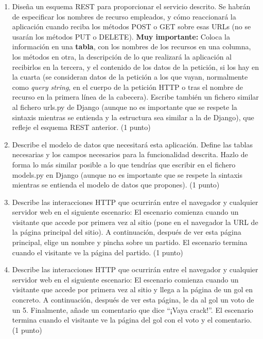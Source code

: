\begin{enumerate}
  \item Diseña un esquema REST para proporcionar el servicio descrito. Se habrán de especificar los nombres de recurso empleados, y cómo reaccionará la aplicación cuando reciba los métodos POST o GET sobre esas URLs (no se usarán los métodos PUT o DELETE). \textbf{Muy importante:} Coloca la información en una \textbf{tabla}, con los nombres de los recursos en una columna, los métodos en otra, la descripción de lo que realizará la aplicación al recibirlos en la tercera, y el contenido de los datos de la petición, si los hay en la cuarta (se consideran datos de la petición a los que vayan, normalmente como \emph{query string}, en el cuerpo de la petición HTTP o tras el nombre de recurso en la primera línea de la cabecera). Escribe también un fichero similar al fichero urls.py de Django (aunque no es importante que se respete la sintaxis mientras se entienda y la estructura sea similar a la de Django), que refleje el esquema REST anterior. (1 punto)

  \item Describe el modelo de datos que necesitará esta aplicación. Define las tablas necesarias y los campos necesarios para la funcionalidad descrita. Hazlo de forma lo más similar posible a lo que tendrías que escribir en el fichero models.py en Django (aunque no es importante que se respete la sintaxis mientras se entienda el modelo de datos que propones). (1 punto)

  \item Describe las interacciones HTTP que ocurrirán entre el navegador y cualquier servidor web en el siguiente escenario: El escenario comienza cuando un visitante que accede por primera vez al sitio (pone en el navegador la URL de la página principal del sitio). A continuación, después de ver esta página principal, elige un nombre y pincha sobre un partido. El escenario termina cuando el visitante ve la página del partido. (1 punto)

  \item Describe las interacciones HTTP que ocurrirán entre el navegador y cualquier servidor web en el siguiente escenario: El escenario comienza cuando un visitante que accede por primera vez al sitio y llega a la página de un gol en concreto. A continuación, después de ver esta página, le da al gol un voto de un 5. Finalmente, añade un comentario que dice ``¡Vaya crack!''. El escenario termina cuando el visitante ve la página del gol con el voto y el comentario. (1 punto)


\end{enumerate}
